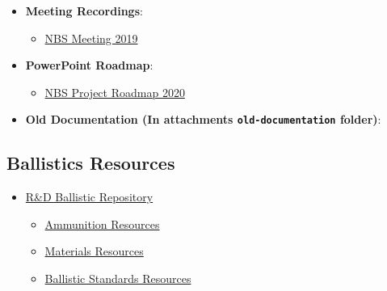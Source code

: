 \begin{itemize}
    \item \textbf{Meeting Recordings}:
    \begin{itemize}
        \item \href{https://nfmgroup.sharepoint.com/sites/TeamNBS/_layouts/15/stream.aspx?id=%2Fsites%2FTeamNBS%2FShared%20Documents%2FDevelopment%2FJournal%2F2019%2D03%2D06%20Ballistic%20DB%20Meeting%20Recording%2FAnalysis%20in%20Poland%20%2D%20Ballistics%20APP%20%2D%206%20marca%202019%2012%2E59%2E27%2Emp4&referrer=StreamWebApp%2EWeb&referrerScenario=AddressBarCopied%2Eview%2E8bb7dc3d%2Db572%2D45a0%2Db561%2Df8b5bdb5c8d0}{NBS Meeting 2019}
    \end{itemize}
    
    \item \textbf{PowerPoint Roadmap}:
    \begin{itemize}
        \item \href{https://nfmgroup.sharepoint.com/:p:/r/sites/TeamNBS/_layouts/15/Doc.aspx?sourcedoc=%7B94EF8FD6-C868-4573-8391-12CF90B109A7%7D&file=2020-04-17%20Ballistic%20DataBase%20Road%20Map%202020.pptx&action=edit&mobileredirect=true}{NBS Project Roadmap 2020}
    \end{itemize}
    
    \item \textbf{Old Documentation (In attachments \texttt{old-documentation} folder)}:
\end{itemize}

\subsection{Ballistics Resources}

\begin{itemize}
    \item \href{https://nfmgroup.sharepoint.com/sites/RDB/Shared%20Documents/Forms/AllItems.aspx}{R\&D Ballistic Repository}
    \begin{itemize}
        \item \href{https://nfmgroup.sharepoint.com/sites/RDB/Shared%20Documents/Forms/AllItems.aspx?id=%2Fsites%2FRDB%2FShared%20Documents%2FBullets%20and%20range&viewid=8f1f582c%2D0312%2D4c50%2Dacf4%2De96ce474fe47}{Ammunition Resources}
        \item \href{https://nfmgroup.sharepoint.com/sites/RDB/Shared%20Documents/Forms/AllItems.aspx?id=%2Fsites%2FRDB%2FShared%20Documents%2FRaw%20Materials&viewid=8f1f582c%2D0312%2D4c50%2Dacf4%2De96ce474fe47}{Materials Resources}
        \item \href{https://nfmgroup.sharepoint.com/sites/RDB/Shared%20Documents/Forms/AllItems.aspx?id=%2Fsites%2FRDB%2FShared%20Documents%2FStandards&viewid=8f1f582c%2D0312%2D4c50%2Dacf4%2De96ce474fe47}{Ballistic Standards Resources}
    \end{itemize}
\end{itemize}

